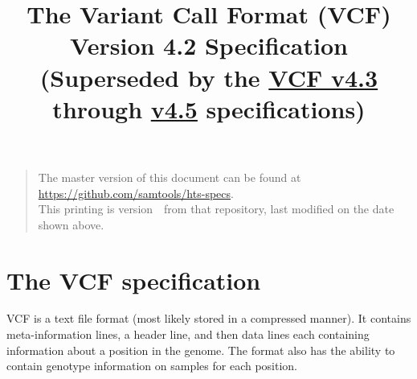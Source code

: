 \documentclass[8pt]{article}
\begin{document}

\title{The Variant Call Format (VCF) Version 4.2 Specification
\normalsize\\[2ex]
(Superseded by the \href{http://samtools.github.io/hts-specs/VCFv4.3.pdf}{VCF v4.3} through \href{http://samtools.github.io/hts-specs/VCFv4.5.pdf}{v4.5} specifications)}
\date{\headdate}
\maketitle
\begin{quote}\small
The master version of this document can be found at
\url{https://github.com/samtools/hts-specs}.\\
This printing is version~\commitdesc\ from that repository,
last modified on the date shown above.
\end{quote}
\vspace*{1em}

\section{The VCF specification}
VCF is a text file format (most likely stored in a compressed manner). It contains meta-information lines, a header line, and then data lines each containing information about a position in the genome.
The format also has the ability to contain genotype information on samples for each position.
\end{document}
